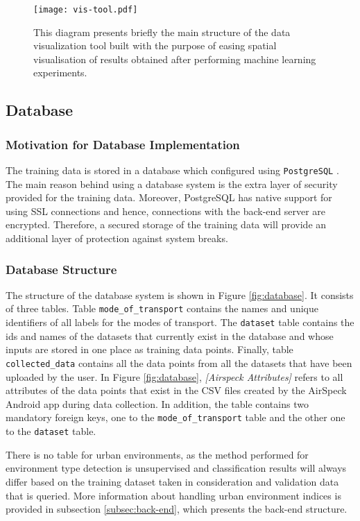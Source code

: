 \documentclass[bsc,frontabs,twoside,singlespacing,parskip,deptreport]{infthesis}     %
\begin{document}
\begin{figure}[h!]
  \center
  \texttt{[image: vis-tool.pdf]}
  \caption{This diagram presents briefly the main structure of the data visualization tool built with the purpose of easing spatial visualisation of results obtained after performing machine learning experiments.}
  \label{fig:vis-tool}
\end{figure}


\subsection{Database}
\label{subsec:database}

\subsubsection*{Motivation for Database Implementation}

The training data is stored in a database which configured using \texttt{PostgreSQL} \cite{postgres}. The main reason behind using a database system is the extra layer of security provided for the training data. Moreover, PostgreSQL has native support for using SSL connections and hence, connections with the back-end server are encrypted. Therefore, a secured storage of the training data will provide an additional layer of protection against system breaks.

\subsubsection*{Database Structure}

The structure of the database system is shown in Figure \ref{fig:database}. It consists of three tables. Table \texttt{mode\_of\_transport} contains the names and unique identifiers of all labels for the modes of transport. The \texttt{dataset} table contains the ids and names of the datasets that currently exist in the database and whose inputs are stored in one place as training data points. Finally, table \texttt{collected\_data} contains all the data points from all the datasets that have been uploaded by the user. In Figure \ref{fig:database}, \textit{[Airspeck Attributes]} refers to all attributes of the data points that exist in the CSV files created by the AirSpeck Android app during data collection. In addition, the table contains two mandatory foreign keys, one to the \texttt{mode\_of\_transport} table and the other one to the \texttt{dataset} table.

There is no table for urban environments, as the method performed for environment type detection is unsupervised and classification results will always differ based on the training dataset taken in consideration and validation data that is queried. More information about handling urban environment indices is provided in subsection \ref{subsec:back-end}, which presents the back-end structure.
\end{document}
